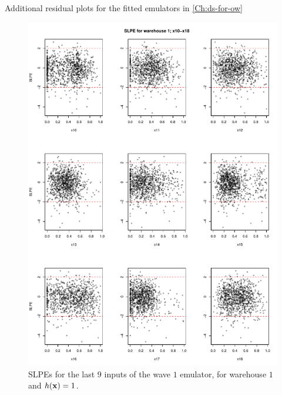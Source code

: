 \begin{chapter}{Additional residual plots  for the fitted emulators in \cref{Ch:ds-for-ow} \label{App:resid}}
\begin{figure}
  \centering
  \includegraphics[width=\textwidth]{fig-app-ds/w1-w1-2.pdf}
  \caption{SLPEs for the last $9$ inputs of the wave $1$ emulator, for warehouse $1$ and $h(\mathbf{x}) = 1$.}
\end{figure}
\begin{figure}
  \centering

\end{figure}
\end{chapter}
